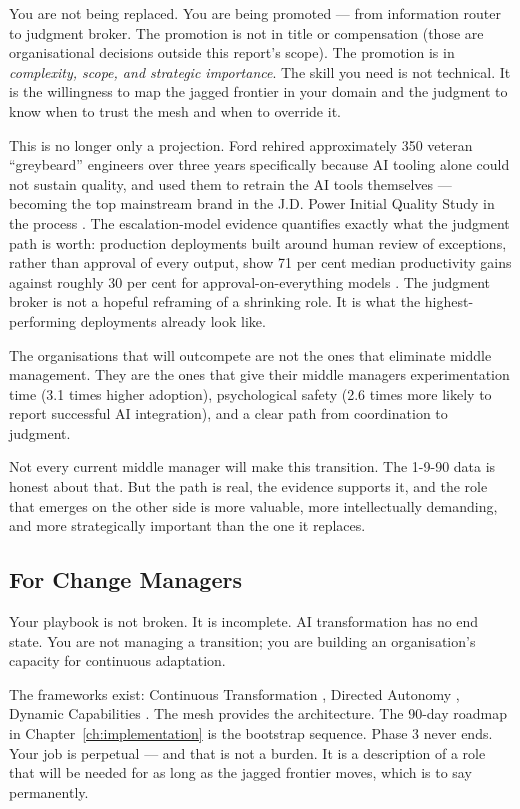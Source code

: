 You are not being replaced. You are being promoted --- from information router to judgment broker. The promotion is not in title or compensation (those are organisational decisions outside this report's scope). The promotion is in \emph{complexity, scope, and strategic importance}. The skill you need is not technical. It is the willingness to map the jagged frontier in your domain and the judgment to know when to trust the mesh and when to override it.

This is no longer only a projection. Ford rehired approximately 350 veteran ``greybeard'' engineers over three years specifically because AI tooling alone could not sustain quality, and used them to retrain the AI tools themselves --- becoming the top mainstream brand in the J.D. Power Initial Quality Study in the process \parencite{Bloomberg2026Ford}. The escalation-model evidence quantifies exactly what the judgment path is worth: production deployments built around human review of exceptions, rather than approval of every output, show 71 per cent median productivity gains against roughly 30 per cent for approval-on-everything models \parencite{Pereira2026Playbook}. The judgment broker is not a hopeful reframing of a shrinking role. It is what the highest-performing deployments already look like.

The organisations that will outcompete are not the ones that eliminate middle management. They are the ones that give their middle managers experimentation time (3.1 times higher adoption), psychological safety (2.6 times more likely to report successful AI integration), and a clear path from coordination to judgment.

Not every current middle manager will make this transition. The 1-9-90 data is honest about that. But the path is real, the evidence supports it, and the role that emerges on the other side is more valuable, more intellectually demanding, and more strategically important than the one it replaces.

\subsection{For Change Managers}

Your playbook is not broken. It is incomplete. AI transformation has no end state. You are not managing a transition; you are building an organisation's capacity for continuous adaptation.

The frameworks exist: Continuous Transformation \parencite{WadeBonnet2025}, Directed Autonomy \parencite{MicrosoftDirectedAutonomy2025}, Dynamic Capabilities \parencite{Teece2025}. The mesh provides the architecture. The 90-day roadmap in Chapter~\ref{ch:implementation} is the bootstrap sequence. Phase 3 never ends. Your job is perpetual --- and that is not a burden. It is a description of a role that will be needed for as long as the jagged frontier moves, which is to say permanently.

